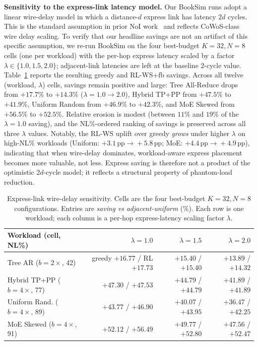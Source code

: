 \documentclass[conference]{IEEEtran}
\begin{document}
\textbf{Sensitivity to the express-link latency model.}
Our BookSim runs adopt a linear wire-delay model in which a distance-$d$ express link has latency $2d$ cycles. This is the standard assumption in prior NoI work~\cite{kite,florets} and reflects CoWoS-class wire delay scaling. To verify that our headline savings are not an artifact of this specific assumption, we re-run BookSim on the four best-budget $K{=}32, N{=}8$ cells (one per workload) with the per-hop express latency scaled by a factor $\lambda\in\{1.0, 1.5, 2.0\}$; adjacent-link latencies are left at the baseline 2-cycle value. Table~\ref{tab:lambda_sensitivity} reports the resulting greedy and RL-WS+fb savings. Across all twelve (workload, $\lambda$) cells, savings remain positive and large: Tree All-Reduce drops from $+17.7\%$ to $+14.3\%$ ($\lambda{=}1.0\!\to\!2.0$), Hybrid TP+PP from $+47.5\%$ to $+41.9\%$, Uniform Random from $+46.9\%$ to $+42.3\%$, and MoE Skewed from $+56.5\%$ to $+52.5\%$. Relative erosion is modest (between $11\%$ and $19\%$ of the $\lambda{=}1.0$ saving), and the NL\%-ordered ranking of savings is preserved across all three $\lambda$ values. Notably, the RL-WS uplift over greedy \textit{grows} under higher $\lambda$ on high-NL\% workloads (Uniform: $+3.1\,\text{pp}\!\to\!+5.8\,\text{pp}$; MoE: $+4.4\,\text{pp}\!\to\!+4.9\,\text{pp}$), indicating that when wire-delay dominates, workload-aware express placement becomes more valuable, not less. Express saving is therefore not a product of the optimistic $2d$-cycle model; it reflects a structural property of phantom-load reduction.

\begin{table}[t]
\centering
\caption{Express-link wire-delay sensitivity. Cells are the four best-budget $K{=}32, N{=}8$ configurations. Entries are \emph{saving vs adjacent-uniform} (\%). Each row is one workload; each column is a per-hop express-latency scaling factor $\lambda$.}
\label{tab:lambda_sensitivity}
\footnotesize
\begin{tabular}{lrrr}
\toprule
Workload (cell, NL\%) & $\lambda{=}1.0$ & $\lambda{=}1.5$ & $\lambda{=}2.0$ \\
\midrule
Tree AR ($b{=}2\times$, 42) &
  greedy $+16.77$ / RL $+17.73$ &
  $+15.40$ / $+15.40$ &
  $+13.89$ / $+14.32$ \\
Hybrid TP+PP ($b{=}4\times$, 77) &
  $+47.30$ / $+47.53$ &
  $+44.79$ / $+44.79$ &
  $+41.89$ / $+41.89$ \\
Uniform Rand. ($b{=}4\times$, 89) &
  $+43.77$ / $+46.90$ &
  $+40.07$ / $+43.95$ &
  $+36.47$ / $+42.25$ \\
MoE Skewed ($b{=}4\times$, 91) &
  $+52.12$ / $+56.49$ &
  $+49.77$ / $+52.80$ &
  $+47.56$ / $+52.47$ \\
\bottomrule
\end{tabular}
\end{table}
\end{document}
